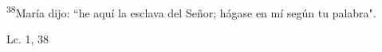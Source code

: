 \documentclass[../../rosario.tex]{subfiles}
\begin{document}
    \textsuperscript{38}María dijo: ``he aquí la esclava del Señor; hágase en mí según tu palabra".
    \begin{flushright}
    Lc. 1, 38
    \end{flushright}
\end{document}
